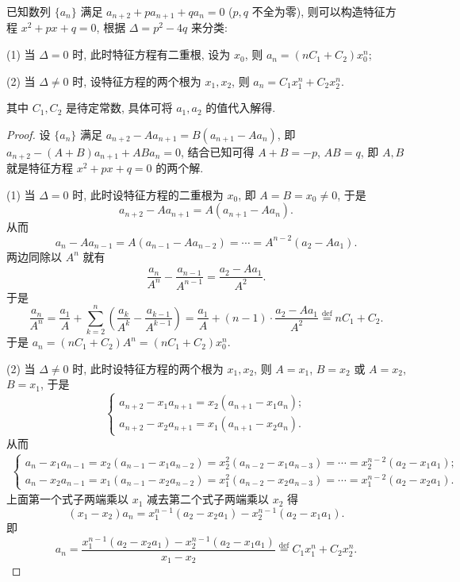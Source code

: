 \documentclass[../../main.tex]{subfiles}
\begin{document}
\begin{proposition}\label{proposition:可直接求通项--类型二}
已知数列 $\{a_n\}$ 满足 $a_{n + 2} + p a_{n + 1} + q a_n = 0$ ($p, q$ 不全为零), 则可以构造特征方程 $x^2 + p x + q = 0$, 根据 $\Delta = p^2 - 4 q$ 来分类:

(1) 当 $\Delta = 0$ 时, 此时特征方程有二重根, 设为 $x_0$, 则 $a_n = (n C_1 + C_2) x_0^n$;

(2) 当 $\Delta \neq 0$ 时, 设特征方程的两个根为 $x_1, x_2$, 则 $a_n = C_1 x_1^n + C_2 x_2^n$.

其中 $C_1, C_2$ 是待定常数, 具体可将 $a_1, a_2$ 的值代入解得.
\end{proposition}
\begin{proof}
设 $\{a_n\}$ 满足 $a_{n + 2} - A a_{n + 1} = B(a_{n + 1} - A a_n)$, 即 $a_{n + 2} - (A + B) a_{n + 1} + A B a_n = 0$, 结合已知可得 $A + B = -p$, $A B = q$, 即 $A, B$ 就是特征方程 $x^2 + p x + q = 0$ 的两个解.

(1) 当 $\Delta = 0$ 时, 此时设特征方程的二重根为 $x_0$, 即 $A = B = x_0 \neq 0$, 于是
\[
a_{n + 2} - A a_{n + 1} = A(a_{n + 1} - A a_n).
\]
从而
\[
a_n - A a_{n - 1} = A(a_{n - 1} - A a_{n - 2}) = \cdots = A^{n - 2}(a_2 - A a_1).
\]
两边同除以 $A^n$ 就有
\[
\frac{a_n}{A^n} - \frac{a_{n - 1}}{A^{n - 1}} = \frac{a_2 - A a_1}{A^2}.
\]
于是
\[
\frac{a_n}{A^n} = \frac{a_1}{A} + \sum_{k = 2}^n \left( \frac{a_k}{A^k} - \frac{a_{k - 1}}{A^{k - 1}} \right) = \frac{a_1}{A} + (n - 1) \cdot \frac{a_2 - A a_1}{A^2} \stackrel{\text{def}}{=} n C_1 + C_2.
\]
于是 $a_n = (n C_1 + C_2) A^n = (n C_1 + C_2) x_0^n$.

(2) 当 $\Delta \neq 0$ 时, 此时设特征方程的两个根为 $x_1, x_2$, 则 $A = x_1$, $B = x_2$ 或 $A = x_2$, $B = x_1$, 于是
\[
\begin{cases} 
a_{n + 2} - x_1 a_{n + 1} = x_2(a_{n + 1} - x_1 a_n); \\
a_{n + 2} - x_2 a_{n + 1} = x_1(a_{n + 1} - x_2 a_n).
\end{cases}
\]
从而
\begin{align*}
\begin{cases}
a_n - x_1 a_{n - 1} = x_2(a_{n - 1} - x_1 a_{n - 2}) = x_2^2(a_{n - 2} - x_1 a_{n - 3}) = \cdots = x_2^{n - 2}(a_2 - x_1 a_1);\\
a_n - x_2 a_{n - 1} = x_1(a_{n - 1} - x_2 a_{n - 2}) = x_1^2(a_{n - 2} - x_2 a_{n - 3}) = \cdots = x_1^{n - 2}(a_2 - x_2 a_1).
\end{cases}
\end{align*}
上面第一个式子两端乘以 $x_1$ 减去第二个式子两端乘以 $x_2$ 得
\[
(x_1 - x_2) a_n = x_1^{n - 1}(a_2 - x_2 a_1) - x_2^{n - 1}(a_2 - x_1 a_1).
\]
即
\[
a_n = \frac{x_1^{n - 1}(a_2 - x_2 a_1) - x_2^{n - 1}(a_2 - x_1 a_1)}{x_1 - x_2} \stackrel{\text{def}}{=} C_1 x_1^n + C_2 x_2^n.
\]

\end{proof}
\end{document}
